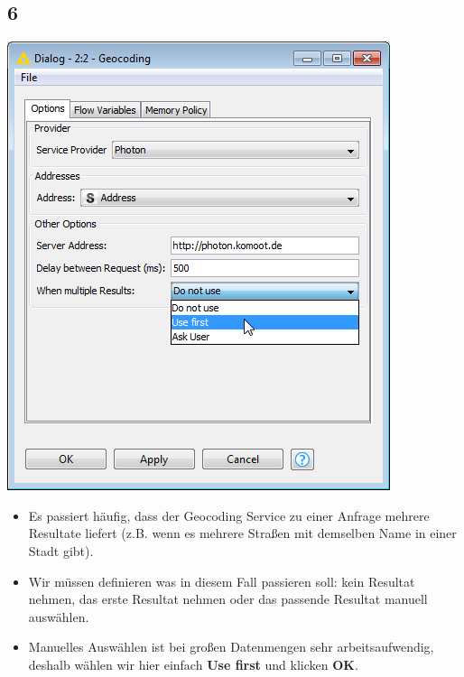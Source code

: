 \documentclass{beamer}
\begin{document}
\subsection{6}
\begin{frame}
	\begin{center}
  		\includegraphics[height=0.5\textheight]{6.png}
	\end{center}
	\begin{itemize}
		\item Es passiert häufig, dass der Geocoding Service zu einer Anfrage mehrere Resultate liefert (z.B. wenn es mehrere Straßen mit demselben Name in einer Stadt gibt).
		\item Wir müssen definieren was in diesem Fall passieren soll: kein Resultat nehmen, das erste Resultat nehmen oder das passende Resultat manuell auswählen.
		\item Manuelles Auswählen ist bei großen Datenmengen sehr arbeitsaufwendig, deshalb wählen wir hier einfach \textbf{Use first} und klicken \textbf{OK}.
	\end{itemize}
\end{frame}
\end{document}
